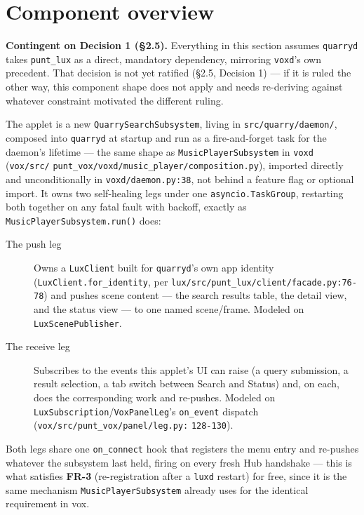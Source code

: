 \documentclass[a4paper,11pt]{report}
\newcommand{\fr}[1]{\textbf{FR-#1}}
\begin{document}
\section{Component overview}

\textbf{Contingent on Decision 1 (\S2.5).} Everything in this section
assumes \texttt{quarryd} takes \texttt{punt\_lux} as a direct, mandatory
dependency, mirroring \texttt{voxd}'s own precedent. That decision is not
yet ratified (\S2.5, Decision 1) --- if it is ruled the other way, this
component shape does not apply and needs re-deriving against whatever
constraint motivated the different ruling.

The applet is a new \texttt{QuarrySearchSubsystem}, living in
\texttt{src/quarry/daemon/}, composed into \texttt{quarryd} at startup and
run as a fire-and-forget task for the daemon's lifetime --- the same shape
as \texttt{MusicPlayerSubsystem} in \texttt{voxd} (\texttt{vox/src/}\allowbreak
\texttt{punt\_vox/voxd/music\_player/composition.py}), imported directly
and unconditionally in \texttt{voxd/daemon.py:38}, not behind a feature
flag or optional import. It owns two self-healing legs under one
\texttt{asyncio.TaskGroup}, restarting both together on any fatal fault
with backoff, exactly as \texttt{MusicPlayerSubsystem.run()} does:

\begin{description}
  \item[The push leg] Owns a \texttt{LuxClient} built for
    \texttt{quarryd}'s own app identity (\texttt{LuxClient.for\_identity},
    per \texttt{lux/src/punt\_lux/client/facade.py:76-78}) and pushes
    scene content --- the search results table, the detail view, and the
    status view --- to one named scene/frame. Modeled on
    \texttt{LuxScenePublisher}.
  \item[The receive leg] Subscribes to the events this applet's UI can
    raise (a query submission, a result selection, a tab switch between
    Search and Status) and, on each, does the corresponding work and
    re-pushes. Modeled on \texttt{LuxSubscription}/\texttt{VoxPanelLeg}'s
    \texttt{on\_event} dispatch (\texttt{vox/src/punt\_vox/panel/leg.py:}\allowbreak
    \texttt{128-130}).
\end{description}

Both legs share one \texttt{on\_connect} hook that registers the menu
entry and re-pushes whatever the subsystem last held, firing on every
fresh Hub handshake --- this is what satisfies \fr{3} (re-registration
after a \texttt{luxd} restart) for free, since it is the same mechanism
\texttt{MusicPlayerSubsystem} already uses for the identical requirement
in vox.
\end{document}
